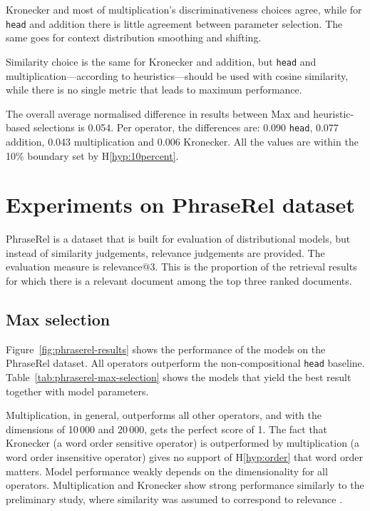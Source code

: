 Kronecker and most of multiplication's discriminativeness choices agree, while for \texttt{head} and addition there is little agreement between parameter selection. The same goes for context distribution smoothing and shifting.

Similarity choice is the same for Kronecker and addition, but \texttt{head} and multiplication---according to heuristics---should be used with cosine similarity, while there is no single metric that leads to maximum performance.

The overall average normalised difference in results between Max and heuristic-based selections is 0.054. Per operator, the differences are: 0.090 \texttt{head}, 0.077 addition, 0.043 multiplication and 0.006 Kronecker. All the values are within the 10\% boundary set by H\ref{hyp:10percent}.

\section{Experiments on PhraseRel dataset}
\label{sec:phraserel-experiment}

PhraseRel is a dataset that is built for evaluation of distributional models, but instead of similarity judgements, relevance judgements are provided. The evaluation measure is relevance@3. This is the proportion of the retrieval results for which there is a relevant document among the top three ranked documents.

\subsection{Max selection}
\label{sec:max-selection-phraserel}



Figure~\ref{fig:phraserel-results} shows the performance of the models on the PhraseRel dataset. All operators outperform the non-compositional \texttt{head} baseline. Table~\ref{tab:phraserel-max-selection} shows the models that yield the best result together with model parameters.

Multiplication, in general, outperforms all other operators, and with the dimensions of 10\,000 and 20\,000, gets the perfect score of 1. The fact that Kronecker (a word order sensitive operator) is outperformed by multiplication (a word order insensitive operator) gives no support of H\ref{hyp:order} that word order matters. Model performance weakly depends on the dimensionality for all operators. Multiplication and Kronecker show strong performance similarly to the preliminary study, where similarity was assumed to correspond to relevance \cite{Milajevs:2015:IMN:2808194.2809448}.

